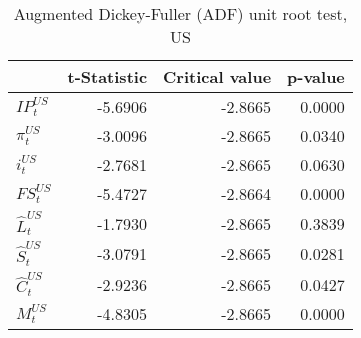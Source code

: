 \begin{table}[t]
    \centering
    \begin{tabular}{lrrr}
        \toprule
        {} &  t-Statistic &  Critical value &  p-value \\
        \midrule
        $IP^{US}_{t}$  &      -5.6906 &         -2.8665 &   0.0000 \\
        $\pi^{US}_{t}$ &      -3.0096 &         -2.8665 &   0.0340 \\
        $i^{US}_{t}$   &      -2.7681 &         -2.8665 &   0.0630 \\
        $FS^{US}_{t}$  &      -5.4727 &         -2.8664 &   0.0000 \\
        $\hat{L}^{US}_{t}$   &      -1.7930 &         -2.8665 &   0.3839 \\
        $\hat{S}^{US}_{t}$   &      -3.0791 &         -2.8665 &   0.0281 \\
        $\hat{C}^{US}_{t}$   &      -2.9236 &         -2.8665 &   0.0427 \\
        $M^{US}_{t}$   &      -4.8305 &         -2.8665 &   0.0000 \\
        \bottomrule
    \end{tabular}
    \caption{Augmented Dickey-Fuller (ADF) unit root test, US}
    \label{tab:adf_us}
\end{table}


